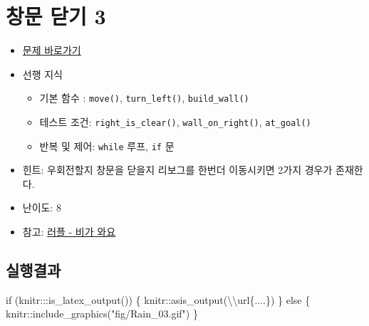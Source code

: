 \documentclass[
  b5paperpaper,
  DIV=11,
  numbers=noendperiod]{scrreprt}
\newenvironment{Shaded}{\begin{snugshade}}{\end{snugshade}}
\newcommand{\ControlFlowTok}[1]{\textcolor[rgb]{0.00,0.23,0.31}{#1}}
\newcommand{\FunctionTok}[1]{\textcolor[rgb]{0.28,0.35,0.67}{#1}}
\newcommand{\NormalTok}[1]{\textcolor[rgb]{0.00,0.23,0.31}{#1}}
\newcommand{\SpecialCharTok}[1]{\textcolor[rgb]{0.37,0.37,0.37}{#1}}
\newcommand{\StringTok}[1]{\textcolor[rgb]{0.13,0.47,0.30}{#1}}
\providecommand{\tightlist}{%
  \setlength{\itemsep}{0pt}\setlength{\parskip}{0pt}}\usepackage{longtable,booktabs,array}
\begin{document}
\hypertarget{rain-03}{%
\section{창문 닫기 3}\label{rain-03}}

\begin{itemize}
\tightlist
\item
  \href{https://reeborg.ca/reeborg.html?lang=ko-en\&mode=python\&menu=worlds\%2Fmenus\%2Freeborg_intro_en.json\&name=Rain\%202\&url=worlds\%2Ftutorial_en\%2Frain2.json}{문제
  바로가기}
\item
  선행 지식

  \begin{itemize}
  \tightlist
  \item
    기본 함수 : \texttt{move()}, \texttt{turn\_left()},
    \texttt{build\_wall()}
  \item
    테스트 조건: \texttt{right\_is\_clear()},
    \texttt{wall\_on\_right()}, \texttt{at\_goal()}
  \item
    반복 및 제어: \texttt{while} 루프, \texttt{if} 문
  \end{itemize}
\item
  힌트: 우회전할지 창문을 닫을지 리보그를 한번더 이동시키면 2가지 경우가
  존재한다.
\item
  난이도: 8
\item
  참고: \href{http://statkclee.github.io/rur-ple/intro/22-rain.htm}{러플
  - 비가 와요}
\end{itemize}

\hypertarget{uxc2e4uxd589uxacb0uxacfc-22}{%
\subsection{실행결과}\label{uxc2e4uxd589uxacb0uxacfc-22}}

\begin{Shaded}
\begin{Highlighting}[]
\ControlFlowTok{if}\NormalTok{ (knitr}\SpecialCharTok{:::}\FunctionTok{is\_latex\_output}\NormalTok{()) \{}
\NormalTok{  knitr}\SpecialCharTok{::}\FunctionTok{asis\_output}\NormalTok{(}\StringTok{\textquotesingle{}}\SpecialCharTok{\textbackslash{}\textbackslash{}}\StringTok{url\{....\}\textquotesingle{}}\NormalTok{)}
\NormalTok{\} }\ControlFlowTok{else}\NormalTok{ \{}
\NormalTok{  knitr}\SpecialCharTok{::}\FunctionTok{include\_graphics}\NormalTok{(}\StringTok{"fig/Rain\_03.gif"}\NormalTok{)}
\NormalTok{\}}
\end{Highlighting}
\end{Shaded}
\end{document}
